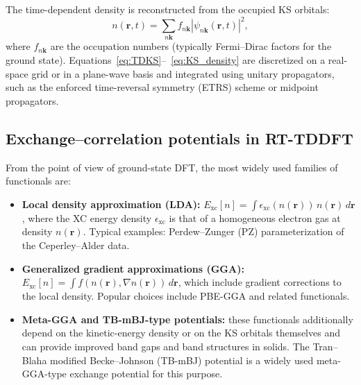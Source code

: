 The time-dependent density is reconstructed from the occupied KS orbitals:
\begin{equation}
  n(\mathbf r,t)
  = \sum_{n\mathbf{k}} f_{n\mathbf{k}}
    \left|\psi_{n\mathbf{k}}(\mathbf r,t)\right|^2,
    \label{eq:KS_density}
\end{equation}
where $f_{n\mathbf{k}}$ are the occupation numbers (typically Fermi--Dirac factors for the ground state).
Equations~\eqref{eq:TDKS}--~\eqref{eq:KS_density} are discretized on a real-space grid or in a plane-wave basis and integrated using unitary propagators, such as the enforced time-reversal symmetry (ETRS) scheme or midpoint propagators.\cite{Yabana2012,Sato2014}

\subsection{Exchange--correlation potentials in RT-TDDFT}


From the point of view of ground-state DFT, the most widely used families of functionals are:

\begin{itemize}
  \item \textbf{Local density approximation (LDA):} $E_{\mathrm{xc}}[n] = \int \epsilon_{\mathrm{xc}}(n(\mathbf r))\,n(\mathbf r)\,d\mathbf r$, where the XC energy density $\epsilon_{\mathrm{xc}}$ is that of a homogeneous electron gas at density $n(\mathbf r)$. 
  Typical examples: Perdew--Zunger (PZ) parameterization of the Ceperley--Alder data.\cite{Botti2007}

  \item \textbf{Generalized gradient approximations (GGA):} $E_{\mathrm{xc}}[n] = \int f(n(\mathbf r),\nabla n(\mathbf r))\,d\mathbf r$, which include gradient corrections to the local density. 
  Popular choices include PBE-GGA and related functionals.\cite{Botti2007}

  \item \textbf{Meta-GGA and TB-mBJ-type potentials:} these functionals additionally depend on the kinetic-energy density or on the KS orbitals themselves and can provide improved band gaps and band structures in solids. The Tran--Blaha modified Becke--Johnson (TB-mBJ) potential is a widely used meta-GGA-type exchange potential for this purpose.\cite{Botti2007}
\end{itemize}

